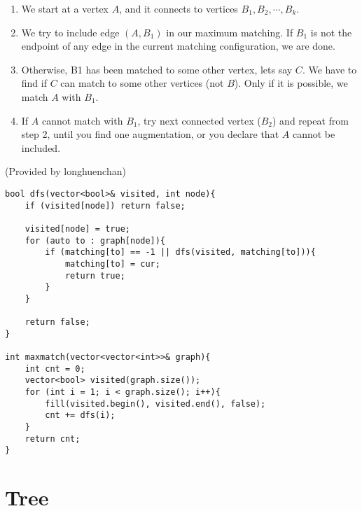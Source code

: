 \documentclass{article}
\begin{document}
\begin{enumerate}
    \item We start at a vertex $A$, and it connects to vertices $B_1, B_2, \cdots, B_k$.
    \item We try to include edge $(A, B_1)$ in our maximum matching. 
    If $B_1$ is not the endpoint of any edge in the current matching configuration, 
    we are done.
    \item Otherwise, B1 has been matched to some other vertex, lets say $C$. 
    We have to find if $C$ can match to some other vertices (not $B$). 
    Only if it is possible, we match $A$ with $B_1$.
    \item If $A$ cannot match with $B_1$, try next connected vertex ($B_2$) and repeat from step 2, 
    until you find one augmentation, or you declare that $A$ cannot be included.
\end{enumerate}
    
(Provided by longhuenchan)
\begin{verbatim}
bool dfs(vector<bool>& visited, int node){
    if (visited[node]) return false;

    visited[node] = true;
    for (auto to : graph[node]){
        if (matching[to] == -1 || dfs(visited, matching[to])){
            matching[to] = cur;
            return true;
        }
    }

    return false;
}

int maxmatch(vector<vector<int>>& graph){
    int cnt = 0;
    vector<bool> visited(graph.size());
    for (int i = 1; i < graph.size(); i++){
        fill(visited.begin(), visited.end(), false);
        cnt += dfs(i);
    }
    return cnt;
}
\end{verbatim}

\section{Tree}
\end{document}
